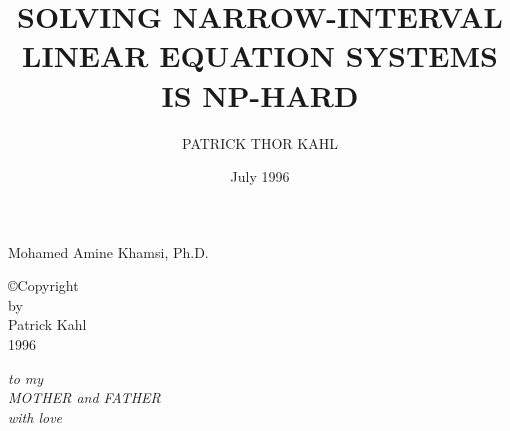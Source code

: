 \documentclass[12pt]{report}
\begin{document}

\setcounter{tocdepth}{2}


\title{SOLVING NARROW-INTERVAL LINEAR EQUATION SYSTEMS IS NP-HARD}

\author{PATRICK THOR KAHL}
\date{July 1996}

                 {Mohamed Amine Khamsi, Ph.D.}


\makesigpage

\begin{CenteredPage}
\copyright Copyright\\[0.2in]
by\\[0.2in]
Patrick Kahl\\[0.2in]
1996
\end{CenteredPage}

\begin{CenteredPage}
{\it to my\\[0.2in]
MOTHER and FATHER\\[0.2in]
with love}
\end{CenteredPage}

\maketitlepage

\end{document}
